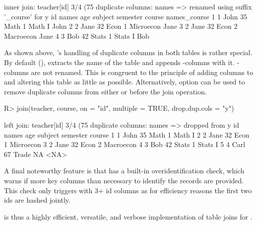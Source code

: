 \documentclass[nojss]{jss} %
\newcommand{\fct}[1]{\code{#1()}}
\begin{document}
\begin{Schunk}
\begin{Soutput}
inner join: teacher[id] 3/4 (75%) <1:1.33> course[id] 4/5 (80%)
duplicate columns: names => renamed using suffix '_course' for y
  id names age subject semester    course names_course
1  1  John  35    Math        1    Math I         John
2  2  Jane  32    Econ        1 Microecon         Jane
3  2  Jane  32    Econ        2 Macroecon         Jane
4  3   Bob  42   Stats        1   Stats I          Bob
\end{Soutput}
\end{Schunk}
As shown above, \fct{join}'s handling of duplicate columns in both tables is rather special. By default (), \fct{join} extracts the name of the  table and appends -columns with it. -columns are not renamed. This is congruent to the principle of adding columns to  and altering this table as little as possible. Alternatively, option  can be used to remove duplicate columns from either  or  before the join operation.
%
\begin{Schunk}
\begin{Sinput}
R> join(teacher, course, on = "id", multiple = TRUE, drop.dup.cols = "y")
\end{Sinput}
\begin{Soutput}
left join: teacher[id] 3/4 (75%) <1:1.33> course[id] 4/5 (80%)
duplicate columns: names => dropped from y
  id names age subject semester    course
1  1  John  35    Math        1    Math I
2  2  Jane  32    Econ        1 Microecon
3  2  Jane  32    Econ        2 Macroecon
4  3   Bob  42   Stats        1   Stats I
5  4  Carl  67   Trade       NA      <NA>
\end{Soutput}
\end{Schunk}
%
A final noteworthy feature is that \fct{fmatch} has a built-in overidentification check, which warns if more key columns than necessary to identify the records are provided. This check only triggers with 3+ id columns as for efficiency reasons the first two ids are hashed jointly.

\fct{join} is thus a highly efficient, versatile, and verbose implementation of table joins for .
%
\end{document}
